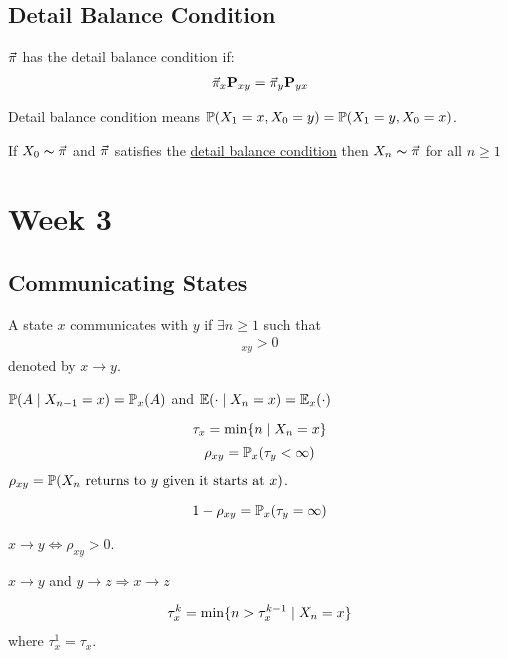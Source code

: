 \documentclass[12pt,a4paper]{article}
\begin{document}
\subsection{Detail Balance Condition}
\begin{defn}
    \label{detailb}
    $\va\pi$ has the detail balance condition if:  
    \begin{align*}
        \va\pi_x \vb{P}_{xy} = \va \pi_y \vb{P}_{yx}
    \end{align*}
\end{defn}
\begin{note}
    Detail balance condition means $\P(X_1 = x, X_0 = y) = \P(X_1 = y , X_0 = x)$. 
\end{note}
\begin{thm}
    If $X_0 \sim \va\pi$ and $\va\pi$ satisfies the \hyperref[detailb]{detail balance condition} then $X_n \sim \va \pi$ for all $n\geq 1$
\end{thm}
\newpage
\section{Week 3}
\subsection{Communicating States}
\begin{defn}
    A state $x$ communicates with $y$ if $\exists n\geq 1$ such that 
    \begin{align*}
        [\vb P^n]_{xy} > 0
    \end{align*}
    denoted by $x \to y$. 
\end{defn}
\begin{note}
    $\P(A \given X_{n-1} = x) = \P_x(A)$ and $\E(\cdot \given X_n = x) = \E_x(\cdot)$
\end{note}
\begin{defn}
    \[\tau_x = \min \{n \given X_n = x\}\]
    \[\rho_{xy} = \P_x(\tau_y < \infty)\]
    $\rho_{xy} = \P(\text{$X_n$ returns to $y$ given it starts at $x$)}$. 
\end{defn}
\begin{note}
    \[1 - \rho_{xy} = \P_x(\tau_y = \infty)\]
\end{note}
\begin{lemma}
    $x\to y \iff \rho_{xy} > 0$.  
\end{lemma}
\begin{lemma}[Transitivity]
    $x\to y$ and $y\to z \Rightarrow x \to z$
\end{lemma}
\begin{defn}
    \label{kthret}
    \begin{align*}
        \tau_x^k = \min \{n > \tau_x^{k-1} \given X_n = x\}
    \end{align*}
    where $\tau_x^1 = \tau_x$. 
\end{defn}
\end{document}
